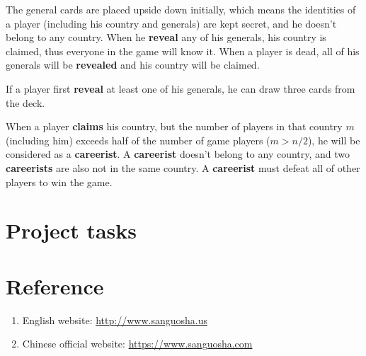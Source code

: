\documentclass[11pt,a4paper]{article}
\begin{document}
The general cards are placed upside down initially, which means the identities of a player (including his country and generals) are kept secret, and he doesn't belong to any country. When he \textbf{reveal} any of his generals, his country is claimed, thus everyone in the game will know it. When a player is dead, all of his generals will be \textbf{revealed} and his country will be claimed. \bigskip

If a player first \textbf{reveal} at least one of his generals, he can draw three cards from the deck. \bigskip

When a player \textbf{claims} his country, but the number of players in that country $m$ (including him) exceeds half of the number of game players ($m>n/2$), he will be considered as a \textbf{careerist}. A \textbf{careerist} doesn't belong to any country, and two \textbf{careerists} are also not in the same country. A \textbf{careerist} must defeat all of other players to win the game.



\section{Project tasks}




\section{Reference}
\begin{enumerate}
\item English website: \url{http://www.sanguosha.us}
\item Chinese official website: \url{https://www.sanguosha.com}
\end{enumerate}
\end{document}
